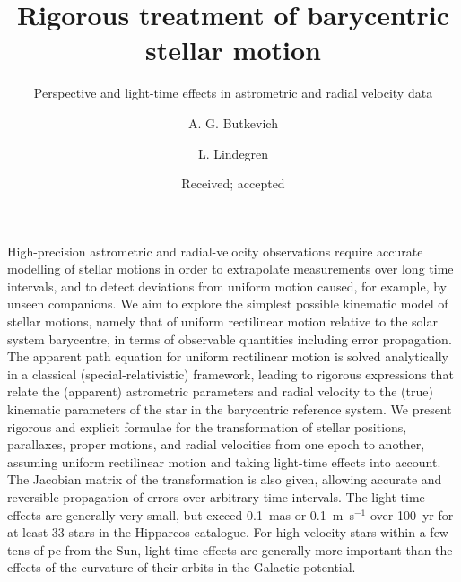 \documentclass{aa}
\begin{document}
\title{Rigorous treatment of barycentric stellar motion}
\subtitle{Perspective and light-time effects in astrometric and radial velocity data}


\author{A. G. Butkevich  \and L. Lindegren}


\date{Received; accepted}

\abstract
{High-precision astrometric and radial-velocity observations require accurate modelling of
stellar motions in order to extrapolate measurements over long time intervals, and to detect
deviations from uniform motion caused, for example, by unseen companions.}
{We aim to explore the simplest possible kinematic model of stellar motions, namely that of
uniform rectilinear motion relative to the solar system barycentre, in terms of observable
quantities including error propagation.}
{The apparent path equation for uniform rectilinear motion is solved analytically in a classical
(special-relativistic) framework, leading to rigorous expressions that relate the (apparent)
astrometric parameters and radial velocity to the (true) kinematic parameters of the star in
the barycentric reference system.}
{We present rigorous and explicit formulae for the transformation of stellar positions, parallaxes,
proper motions, and radial velocities from one epoch to another, assuming uniform rectilinear
motion and taking light-time effects into account. The Jacobian matrix of the transformation
is also given, allowing accurate and reversible propagation of errors over arbitrary time intervals.
The light-time effects are generally very small, but exceed 0.1~mas or 0.1~m~s$^{-1}$ over
100~yr for at least 33 stars in the Hipparcos catalogue. For high-velocity stars within a few tens
of pc from the Sun, light-time effects are generally more important than the effects of the
curvature of their orbits in the Galactic potential.}
{}
\end{document}
